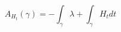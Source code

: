 

\begin{equation}
    A_{H_t}(\gamma)=-\int_\gamma \lambda + \int_\gamma H_t dt
    \label{eqn:floerAction}
\end{equation}